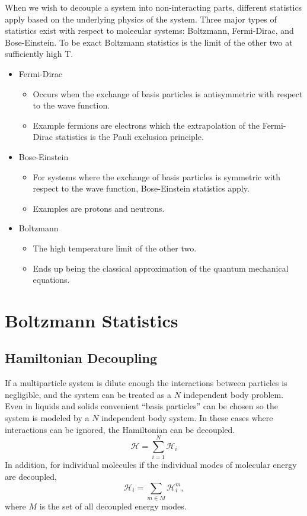 When we wish to decouple a system into non-interacting parts, different
statistics apply based on the underlying physics of the system. Three major
types of statistics exist with respect to molecular systems: Boltzmann,
Fermi-Dirac, and Bose-Einstein. To be exact Boltzmann statistics is the limit of
the other two at sufficiently high T.

\begin{itemize}
	\item Fermi-Dirac
		\begin{itemize}
			\item Occurs when the exchange of basis particles is antisymmetric
				with respect to the wave function.
			\item Example fermions are electrons which the extrapolation of the
				Fermi-Dirac statistics is the Pauli exclusion principle.
		\end{itemize}
	\item Bose-Einstein
		\begin{itemize}
			\item For systems where the exchange of basis particles is symmetric
				with respect to the wave function, Bose-Einstein statistics
				apply.
			\item Examples are protons and neutrons.
		\end{itemize}
	\item Boltzmann
		\begin{itemize}
			\item The high temperature limit of the other two.
			\item Ends up being the classical approximation of the quantum
				mechanical equations.
		\end{itemize}
\end{itemize}

\section{Boltzmann Statistics}\label{sec:Boltzmann Statistics}
\subsection{Hamiltonian Decoupling}
If a multiparticle system is dilute enough the interactions between particles is
negligible, and the system can be treated as a $N$ independent body problem.
Even in liquids and solids convenient ``basis particles'' can be chosen so the
system is modeled by a $N$ independent body system. In these cases where
interactions can be ignored, the Hamiltonian can be decoupled.
\begin{equation*}
	\mathcal{H} = \sum_{i=1}^{N}{\mathcal{H}_i}
\end{equation*}
In addition, for individual molecules if the individual modes of molecular
energy are decoupled,
\begin{equation*}
	\mathcal{H}_i = \sum_{m \in M}{\mathcal{H}_i^{m}},
\end{equation*}
where $M$ is the set of all decoupled energy modes.
